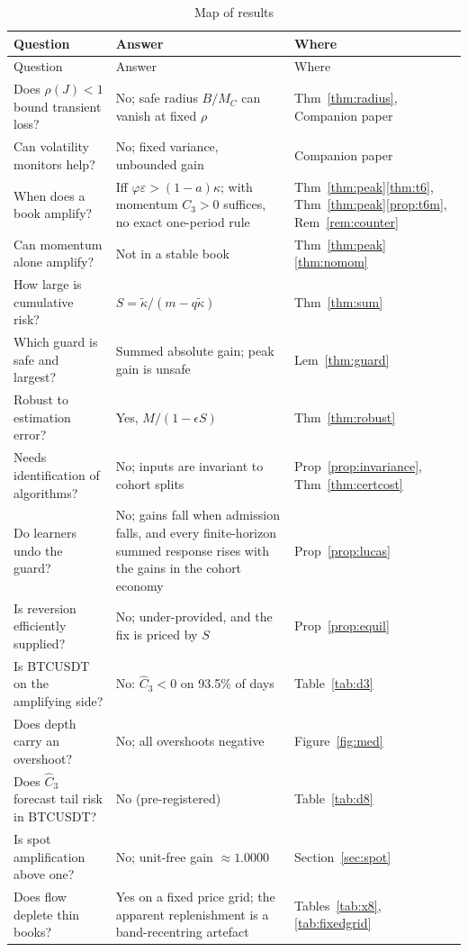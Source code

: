 \documentclass[12pt]{article}
\theoremstyle{definition}
\theoremstyle{remark}
\begin{document}
{\footnotesize\singlespacing
\begin{longtable}{p{}p{}p{}}
\caption{Map of results}\label{tab:map}\\
\toprule
Question & Answer & Where\\
\midrule\endfirsthead\toprule Question & Answer & Where\\\midrule\endhead
Does $\rho(J)<1$ bound transient loss? & No; safe radius $B/M_C$ can vanish at fixed $\rho$ & Thm~\ref{thm:radius}, Companion paper\\
Can volatility monitors help? & No; fixed variance, unbounded gain & Companion paper\\
When does a book amplify? & Iff $\varphi\varepsilon>(1-a)\kappa$; with momentum $C_3>0$ suffices, no exact one-period rule & Thm~\ref{thm:peak}\ref{thm:t6}, Thm~\ref{thm:peak}\ref{prop:t6m}, Rem~\ref{rem:counter}\\
Can momentum alone amplify? & Not in a stable book & Thm~\ref{thm:peak}\ref{thm:nomom}\\
How large is cumulative risk? & $S=\tilde\kappa/(m-q\tilde\kappa)$ & Thm~\ref{thm:sum}\\
Which guard is safe and largest? & Summed absolute gain; peak gain is unsafe & Lem~\ref{thm:guard}\\
Robust to estimation error? & Yes, $M/(1-\epsilon S)$ & Thm~\ref{thm:robust}\\
Needs identification of algorithms? & No; inputs are invariant to cohort splits & Prop~\ref{prop:invariance}, Thm~\ref{thm:certcost}\\
Do learners undo the guard? & No; gains fall when admission falls, and every finite-horizon summed response rises with the gains in the cohort economy & Prop~\ref{prop:lucas}\\
Is reversion efficiently supplied? & No; under-provided, and the fix is priced by $S$ & Prop~\ref{prop:equil}\\
Is BTCUSDT on the amplifying side? & No: $\hat C_3<0$ on 93.5\% of days & Table~\ref{tab:d3}\\
Does depth carry an overshoot? & No; all overshoots negative & Figure~\ref{fig:med}\\
Does $\hat C_3$ forecast tail risk in BTCUSDT? & No (pre-registered) & Table~\ref{tab:d8}\\
Is spot amplification above one? & No; unit-free gain $\approx1.0000$ & Section~\ref{sec:spot}\\
Does flow deplete thin books? & Yes on a fixed price grid; the apparent replenishment is a band-recentring artefact & Tables~\ref{tab:x8}, \ref{tab:fixedgrid}\\

\end{longtable}}
\end{document}
